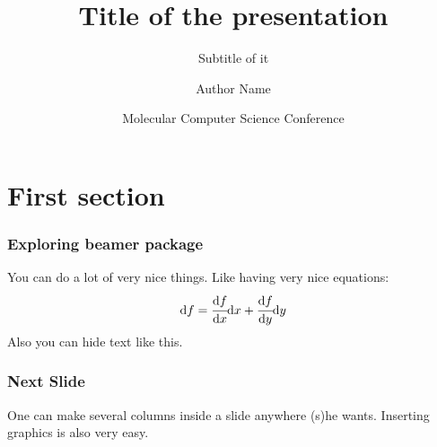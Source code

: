 \documentclass[utf8x,serif,hyperref={unicode},aspectratio=1610]{beamer}
\title{Title of the presentation}
\subtitle{Subtitle of it}
\author{Author Name}
\date[] %
{Molecular Computer Science Conference}
\newcommand{\DD}[2]{\ensuremath{\cfrac{\mathrm{d} #1}{\mathrm{d} #2}}}
\newcommand{\dd}[1]{\ensuremath{\mathrm{d}#1}}
\begin{document}
\begin{frame}
  \titlepage
\end{frame}


\section{First section}

\begin{frame}
    \frametitle{Exploring beamer package}
    You can do a lot of very nice things. Like having very nice equations:
    \begin{equation}
        \dd f = \DD{f}{x}\dd x + \DD{f}{y}\dd y
        \label{eq:exact_diff}
    \end{equation}
    Also you can
    \pause
    hide
    \pause
    text
    \pause
    like
    \pause
    this.
\end{frame}

\begin{frame}
    \frametitle{Next Slide}
    One can make several columns inside a slide anywhere (s)he wants.
    Inserting graphics is also very easy.
\end{frame}
\end{document}
